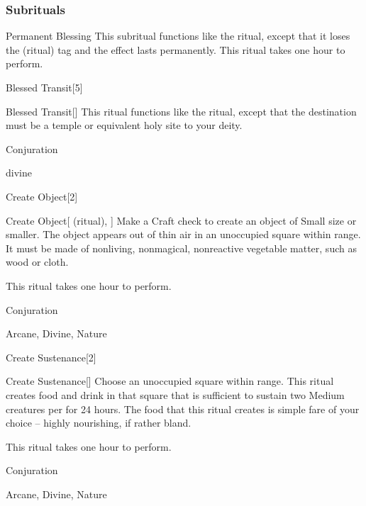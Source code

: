 \subsubsection{Subrituals}


\begin{ability}[\nth{2}]{Permanent Blessing}
This subritual functions like the  ritual, except that it loses the  (ritual) tag and the effect lasts permanently.
This ritual takes one hour to perform.
\end{ability}
\vspace{0.25em}


\begin{spellsection}{Blessed Transit}[5]


\begin{ability}{Blessed Transit}[]
This ritual functions like the  ritual, except that the destination must be a temple or equivalent holy site to your deity.
\end{ability}




 Conjuration

 divine
\end{spellsection}


\begin{spellsection}{Create Object}[2]


\begin{ability}{Create Object}[ (ritual), ]
Make a Craft check to create an object of Small size or smaller.
The object appears out of thin air in an unoccupied square within \rngclose range.
It must be made of nonliving, nonmagical, nonreactive vegetable matter, such as wood or cloth.

This ritual takes one hour to perform.
\end{ability}




 Conjuration

 Arcane, Divine, Nature
\end{spellsection}


\begin{spellsection}{Create Sustenance}[2]


\begin{ability}{Create Sustenance}[]
Choose an unoccupied square within \rngclose range.
This ritual creates food and drink in that square that is sufficient to sustain two Medium creatures per  for 24 hours.
The food that this ritual creates is simple fare of your choice -- highly nourishing, if rather bland.

This ritual takes one hour to perform.
\end{ability}




 Conjuration

 Arcane, Divine, Nature
\end{spellsection}


